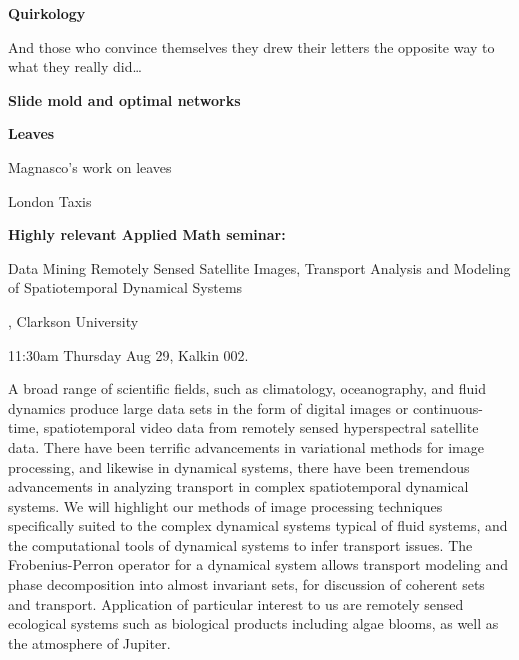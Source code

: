  



  \textbf{Quirkology}

  
  
    And those who convince themselves
    they drew their letters the opposite way
    to what they really did\ldots

    \bigskip

    {}
  



  \textbf{Slide mold and optimal networks}


  \textbf{Leaves}

  Magnasco's work on leaves


  








  London Taxis


  \textbf{Highly relevant Applied Math seminar:}
    
     
       Data Mining Remotely Sensed Satellite Images,
      Transport Analysis and Modeling of Spatiotemporal Dynamical Systems
     
      ,
      Clarkson University
    
       11:30am Thursday Aug 29, Kalkin 002.
    
  

  
    {\tiny %
       A broad range of scientific fields, such as
      climatology, oceanography, and fluid dynamics produce large data sets
      in the form of digital images or continuous-time, spatiotemporal video
      data from remotely sensed hyperspectral satellite data.  There have
      been terrific advancements in variational methods for image
      processing, and likewise in dynamical systems, there have been
      tremendous advancements in analyzing transport in complex
      spatiotemporal dynamical systems.  We will highlight our methods of
      image processing techniques specifically suited to the complex
      dynamical systems typical of fluid systems, and the computational
      tools of dynamical systems to infer transport issues. The
      Frobenius-Perron operator for a dynamical system allows transport
      modeling and phase decomposition into almost invariant sets, for
      discussion of coherent sets and transport.  Application of particular
      interest to us are remotely sensed ecological systems such as
      biological products including algae blooms, as well as the atmosphere
      of Jupiter.}
  



